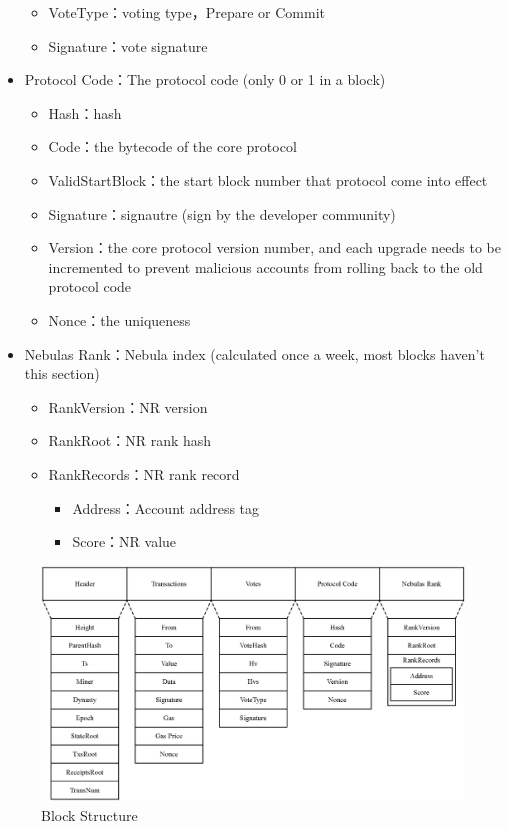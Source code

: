 \begin{itemize}
\begin{itemize}
		\item VoteType：voting type，Prepare or Commit
		\item Signature：vote signature
		\end{itemize}
	\item Protocol Code：The protocol code (only 0 or 1 in a block)
		\begin{itemize}
		\item Hash：hash
		\item Code：the bytecode of the core protocol
		\item ValidStartBlock：the start block number that protocol come into effect
		\item Signature：signautre (sign by the developer community)
		\item Version：the core protocol version number, and each upgrade needs to be incremented to prevent malicious accounts from rolling back to the old protocol code
		\item Nonce：the uniqueness
		\end{itemize}
	\item Nebulas Rank：Nebula index (calculated once a week, most blocks haven't this section)
		\begin{itemize}
		\item RankVersion：NR version
		\item RankRoot：NR rank hash
		\item RankRecords：NR rank record
			\begin{itemize}
				\item Address：Account address tag
				\item Score：NR value
			\end{itemize}
		\end{itemize}
\end{itemize}

\begin{figure}[!h]
\centering
\includegraphics[width=13.8cm]{./figs/block}
\caption{Block Structure}
\label{fig:block}
\end{figure}

